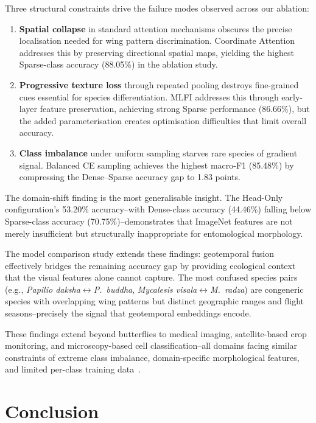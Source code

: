 \documentclass[11pt]{article}
\begin{document}
Three structural constraints drive the failure modes observed across our ablation:
\begin{enumerate}[label=(\arabic*)]
    \item \textbf{Spatial collapse} in standard attention mechanisms obscures the precise localisation needed for wing pattern discrimination. Coordinate Attention addresses this by preserving directional spatial maps, yielding the highest Sparse-class accuracy (88.05\%) in the ablation study.
    \item \textbf{Progressive texture loss} through repeated pooling destroys fine-grained cues essential for species differentiation. MLFI addresses this through early-layer feature preservation, achieving strong Sparse performance (86.66\%), but the added parameterisation creates optimisation difficulties that limit overall accuracy.
    \item \textbf{Class imbalance} under uniform sampling starves rare species of gradient signal. Balanced CE sampling achieves the highest macro-F1 (85.48\%) by compressing the Dense--Sparse accuracy gap to 1.83 points.
\end{enumerate}

The domain-shift finding is the most generalisable insight. The Head-Only configuration's 53.20\% accuracy--with Dense-class accuracy (44.46\%) falling below Sparse-class accuracy (70.75\%)--demonstrates that ImageNet features are not merely insufficient but structurally inappropriate for entomological morphology.

The model comparison study extends these findings: geotemporal fusion effectively bridges the remaining accuracy gap by providing ecological context that the visual features alone cannot capture. The most confused species pairs (e.g., \emph{Papilio daksha}$\leftrightarrow$\emph{P.~buddha}, \emph{Mycalesis visala}$\leftrightarrow$\emph{M.~radza}) are congeneric species with overlapping wing patterns but distinct geographic ranges and flight seasons--precisely the signal that geotemporal embeddings encode.

These findings extend beyond butterflies to medical imaging, satellite-based crop monitoring, and microscopy-based cell classification--all domains facing similar constraints of extreme class imbalance, domain-specific morphological features, and limited per-class training data~\cite{amarathunga2022thrips}.

\section{Conclusion}
\end{document}
